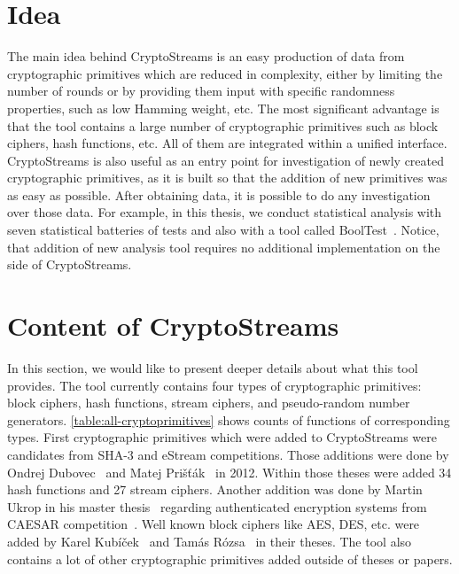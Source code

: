 \documentclass[
    digital,    %
    oneside,    %
    color,
    11pt,
    nocover,
    notable,
    nolof,
    nolot,
    final
]{fithesis3}
\renewcommand\_{\textunderscore\allowbreak}
\begin{document}
\section{Idea}

The main idea behind CryptoStreams is an easy production of data from cryptographic primitives which are reduced in complexity, either by limiting the number of rounds or by providing them input with specific randomness properties, such as low Hamming weight, etc. The most significant advantage is that the tool contains a large number of cryptographic primitives such as block ciphers, hash functions, etc. All of them are integrated within a unified interface. CryptoStreams is also useful as an entry point for investigation of newly created cryptographic primitives, as it is built so that the addition of new primitives was as easy as possible. After obtaining data, it is possible to do any investigation over those data. For example, in this thesis, we conduct statistical analysis with seven statistical batteries of tests and also with a tool called BoolTest~\cite{booltest-secrypt2017}. Notice, that addition of new analysis tool requires no additional implementation on the side of CryptoStreams.

\section{Content of CryptoStreams}

In this section, we would like to present deeper details about what this tool provides. The tool currently contains four types of cryptographic primitives: block ciphers, hash functions, stream ciphers, and pseudo-random number generators. \cref{table:all-cryptoprimitives} shows counts of functions of corresponding types. First cryptographic primitives which were added to CryptoStreams were candidates from SHA-3 and eStream competitions. Those additions were done by Ondrej Dubovec~\cite{Dubovec2012thesis} and Matej Prišťák~\cite{Pristak2012thesis} in 2012. Within those theses were added 34 hash functions and 27 stream ciphers. Another addition was done by Martin Ukrop in his master thesis~\cite{Ukrop2016thesis} regarding authenticated encryption systems from CAESAR competition~\cite{caesar-competition}. Well known block ciphers like AES, DES, etc. were added by Karel Kubíček~\cite{Kubicek2017thesis} and Tamás Rózsa~\cite{Rozsa2018thesis} in their theses. The tool also contains a lot of other cryptographic primitives added outside of theses or papers.
\end{document}
